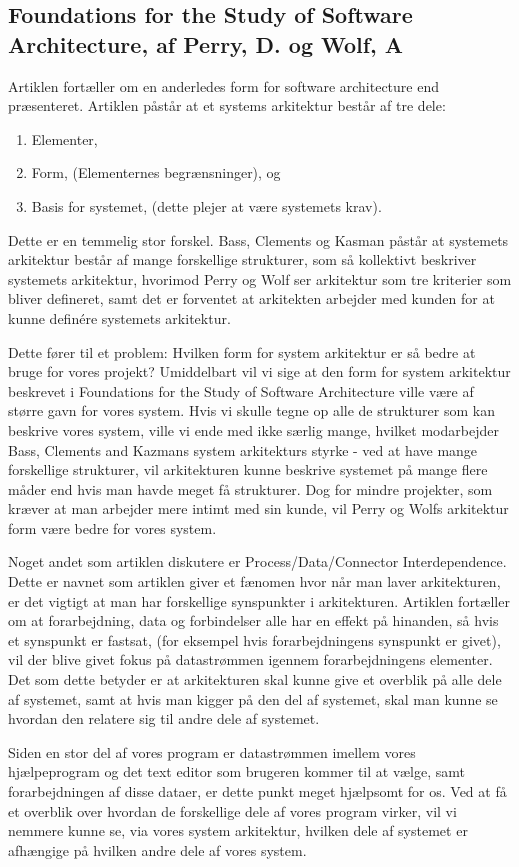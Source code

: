 \documentclass[10pt,a4paper,danish]{article}
\begin{document}
\subsection{Foundations for the Study of Software Architecture, af Perry, D. og Wolf, A}
Artiklen fortæller om en anderledes form for software architecture end præsenteret. Artiklen påstår at et systems arkitektur består af tre dele: 
\begin{enumerate}
\item Elementer,
\item Form, (Elementernes begrænsninger), og
\item Basis for systemet, (dette plejer at være systemets krav).
\end{enumerate}
Dette er en temmelig stor forskel. Bass, Clements og Kasman påstår at systemets arkitektur består af mange forskellige strukturer, som så kollektivt beskriver systemets arkitektur, hvorimod Perry og Wolf ser arkitektur som tre kriterier som bliver defineret, samt det er forventet at arkitekten arbejder med kunden for at kunne definére systemets arkitektur. 

Dette fører til et problem: Hvilken form for system arkitektur er så bedre at bruge for vores projekt? Umiddelbart vil vi sige at den form for system arkitektur beskrevet i Foundations for the Study of Software Architecture ville være af større gavn for vores system. Hvis vi skulle tegne op alle de strukturer som kan beskrive vores system, ville vi ende med ikke særlig mange, hvilket modarbejder Bass, Clements and Kazmans system arkitekturs styrke - ved at have mange forskellige strukturer, vil arkitekturen kunne beskrive systemet på mange flere måder end hvis man havde meget få strukturer. Dog for mindre projekter, som kræver at man arbejder mere intimt med sin kunde, vil Perry og Wolfs arkitektur form være bedre for vores system.

Noget andet som artiklen diskutere er Process/Data/Connector Interdependence. Dette er navnet som artiklen giver et fænomen hvor når man laver arkitekturen, er det vigtigt at man har forskellige synspunkter i arkitekturen. Artiklen fortæller om at forarbejdning, data og forbindelser alle har en effekt på hinanden, så hvis et synspunkt er fastsat, (for eksempel hvis forarbejdningens synspunkt er givet), vil der blive givet fokus på datastrømmen igennem forarbejdningens elementer. Det som dette betyder er at arkitekturen skal kunne give et overblik på alle dele af systemet, samt at hvis man kigger på den del af systemet, skal man kunne se hvordan den relatere sig til andre dele af systemet. 

Siden en stor del af vores program er datastrømmen imellem vores hjælpeprogram og det text editor som brugeren kommer til at vælge, samt forarbejdningen af disse dataer, er dette punkt meget hjælpsomt for os. Ved at få et overblik over hvordan de forskellige dele af vores program virker, vil vi nemmere kunne se, via vores system arkitektur, hvilken dele af systemet er afhængige på hvilken andre dele af vores system.
\end{document}
